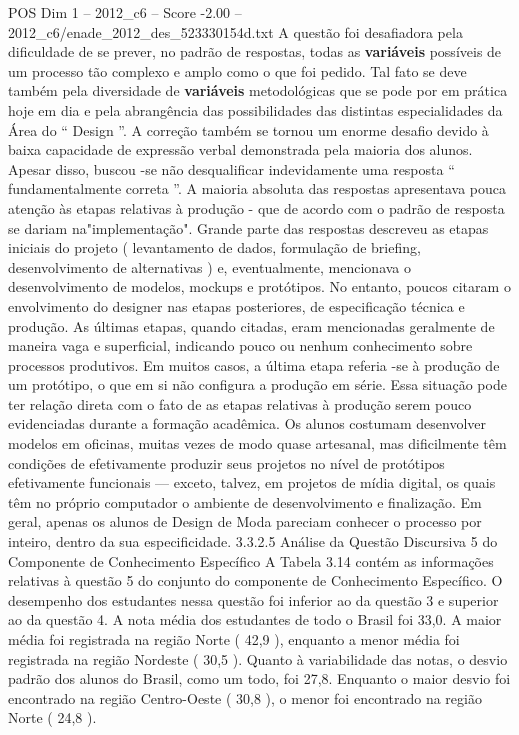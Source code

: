 \begin{textsample}{POS Dim 1 – 2012\_c6 – Score -2.00 – 2012\_c6/enade\_2012\_des\_523330154d.txt}
A questão foi desafiadora pela dificuldade de se prever, no padrão de respostas, todas as \textbf{variáveis} possíveis de um processo tão complexo e amplo como o que foi pedido.
Tal fato se deve também pela diversidade de \textbf{variáveis} metodológicas que se pode por em prática hoje em dia e pela abrangência das possibilidades das distintas especialidades da Área do “ Design ”.
A correção também se tornou um enorme desafio devido à baixa capacidade de expressão verbal demonstrada pela maioria dos alunos.
Apesar disso, buscou -se não desqualificar indevidamente uma resposta “ fundamentalmente correta ”.
A maioria absoluta das respostas apresentava pouca atenção às etapas relativas à produção - que de acordo com o padrão de resposta se dariam na"implementação".
Grande parte das respostas descreveu as etapas iniciais do projeto ( levantamento de dados, formulação de briefing, desenvolvimento de alternativas ) e, eventualmente, mencionava o desenvolvimento de modelos, mockups e protótipos.
No entanto, poucos citaram o envolvimento do designer nas etapas posteriores, de especificação técnica e produção.
As últimas etapas, quando citadas, eram mencionadas geralmente de maneira vaga e superficial, indicando pouco ou nenhum conhecimento sobre processos produtivos.
Em muitos casos, a última etapa referia -se à produção de um protótipo, o que em si não configura a produção em série.
Essa situação pode ter relação direta com o fato de as etapas relativas à produção serem pouco evidenciadas durante a formação acadêmica.
Os alunos costumam desenvolver modelos em oficinas, muitas vezes de modo quase artesanal, mas dificilmente têm condições de efetivamente produzir seus projetos no nível de protótipos efetivamente funcionais — exceto, talvez, em projetos de mídia digital, os quais têm no próprio computador o ambiente de desenvolvimento e finalização.
Em geral, apenas os alunos de Design de Moda pareciam conhecer o processo por inteiro, dentro da sua especificidade. 3.3.2.5 Análise da Questão Discursiva 5 do Componente de Conhecimento Específico A Tabela 3.14 contém as informações relativas à questão 5 do conjunto do componente de Conhecimento Específico.
O desempenho dos estudantes nessa questão foi inferior ao da questão 3 e superior ao da questão 4.
A nota média dos estudantes de todo o Brasil foi 33,0.
A maior média foi registrada na região Norte ( 42,9 ), enquanto a menor média foi registrada na região Nordeste ( 30,5 ).
Quanto à variabilidade das notas, o desvio padrão dos alunos do Brasil, como um todo, foi 27,8.
Enquanto o maior desvio foi encontrado na região Centro-Oeste ( 30,8 ), o menor foi encontrado na região Norte ( 24,8 ).

\end{textsample}
